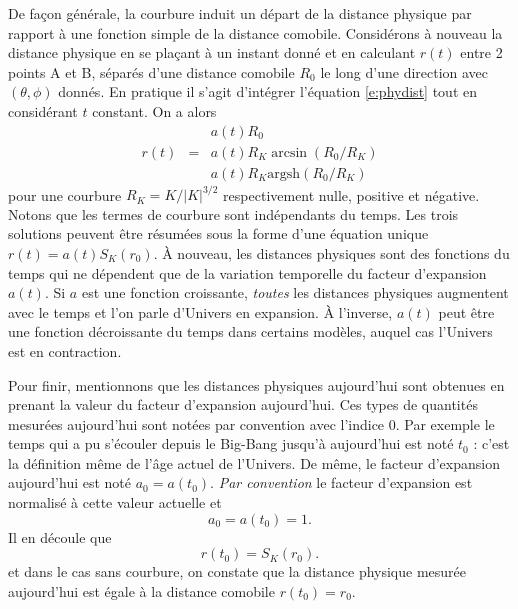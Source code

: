 De façon générale, la courbure induit un départ de la distance physique par rapport à une fonction simple de la distance comobile. Considérons à nouveau la distance physique en se plaçant à un instant donné et en calculant $r(t)$ entre 2 points A et B, séparés d'une distance comobile $R_0$ le long d'une direction avec $(\theta,\phi)$ donnés. En pratique il s'agit d'intégrer l'équation \ref{e:phydist} tout en considérant $t$ constant. On a alors
\begin{eqnarray}
&&a(t)R_0\\
r(t)&=&a(t)R_K \arcsin(R_0/R_K)\\
&&a(t)R_K \mathrm{argsh}(R_0/R_K)
\end{eqnarray}
pour une courbure $R_K=K/|K|^{3/2}$ respectivement nulle, positive et négative. Notons que les termes de courbure sont indépendants du temps. Les trois solutions peuvent être résumées sous la forme d'une équation unique $r(t)=a(t)S_K(r_0)$. À nouveau, les distances physiques sont des fonctions du temps qui ne dépendent que de la variation temporelle du facteur d'expansion $a(t)$. Si $a$ est une fonction croissante, \textit{toutes} les distances physiques augmentent avec le temps et l’on parle d'Univers en expansion. À l'inverse, $a(t)$ peut être une fonction décroissante du temps dans certains modèles, auquel cas l'Univers est en contraction.

Pour finir, mentionnons que les distances physiques aujourd'hui sont obtenues en prenant la valeur du facteur d'expansion aujourd'hui. Ces types de quantités mesurées aujourd'hui sont notées par convention avec l'indice 0. Par exemple le temps qui a pu s'écouler depuis le Big-Bang jusqu'à aujourd'hui est noté $t_0$ : c'est la définition même de l'âge actuel de l'Univers. De même, le facteur d'expansion aujourd'hui est noté $a_0=a(t_0)$.
\textit{Par convention} le facteur d'expansion est normalisé à cette valeur actuelle et 
\begin{equation}
a_0=a(t_0)=1.
\end{equation}
Il en découle que 
\begin{equation}
r(t_0)=S_K(r_0).
\end{equation}
et dans le cas sans courbure, on constate que la distance physique mesurée aujourd'hui est égale à la distance comobile $r(t_0)=r_0$.

